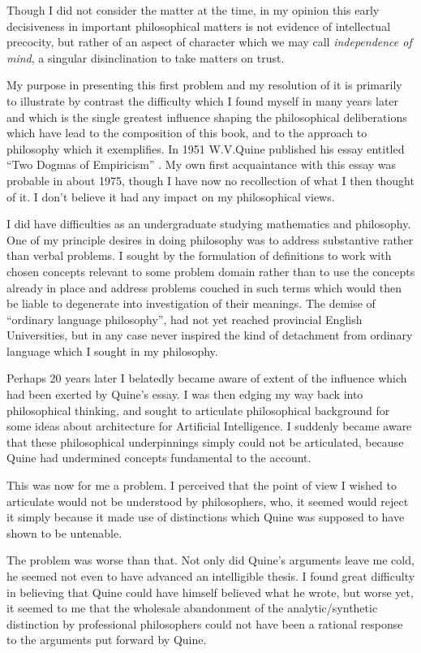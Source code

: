 Though I did not consider the matter at the time, in my opinion this early decisiveness in important philosophical matters is not evidence of intellectual precocity, but rather of an aspect of character which we may call {\it independence of mind}, a singular disinclination to take matters on trust.

My purpose in presenting this first problem and my resolution of it is primarily to illustrate by contrast the difficulty which I found myself in many years later and which is the single greatest influence shaping the philosophical deliberations which have lead to the composition of this book, and to the approach to philosophy which it exemplifies.
In 1951 W.V.Quine published his essay entitled ``Two Dogmas of Empiricism'' \cite{quine51}.
My own first acquaintance with this essay was probable in about 1975, though I have now no recollection of what I then thought of it.
I don't believe it had any impact on my philosophical views.

I did have difficulties as an undergraduate studying mathematics and philosophy.
One of my principle desires in doing philosophy was to address substantive rather than verbal problems.
I sought by the formulation of definitions to work with chosen concepts relevant to some problem domain rather than to use the concepts already in place and address problems couched in such terms which would then be liable to degenerate into investigation of their meanings.
The demise of ``ordinary language philosophy'', had not yet reached provincial English Universities, but in any case never inspired the kind of detachment from ordinary language which I sought in my philosophy.

Perhaps 20 years later I belatedly became aware of extent of the influence which had been exerted by Quine's essay.
I was then edging my way back into philosophical thinking, and sought to articulate philosophical background for some ideas about architecture for Artificial Intelligence.
I suddenly became aware that these philosophical underpinnings simply could not be articulated, because Quine had undermined concepts fundamental to the account.

This was now for me a problem.
I perceived that the point of view I wished to articulate would not be understood by philosophers, who, it seemed would reject it simply because it made use of distinctions which Quine was supposed to have shown to be untenable.

The problem was worse than that.
Not only did Quine's arguments leave me cold, he seemed not even to have advanced an intelligible thesis.
I found great difficulty in believing that Quine could have himself believed what he wrote, but worse yet, it seemed to me that the wholesale abandonment of the analytic/synthetic distinction by professional philosophers could not have been a rational response to the arguments put forward by Quine.

